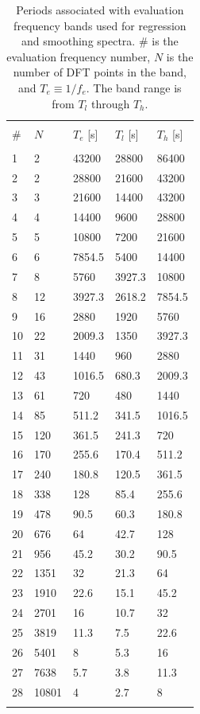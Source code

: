 \documentclass[draft,linenumbers]{agujournal2018}
\begin{document}
\begin{table}
  \caption{Periods associated with evaluation frequency bands used for regression and smoothing spectra. \# is the evaluation frequency number, $N$ is the number of DFT points in the band, and $T_e\equiv 1/f_e$. The band range is from $T_l$ through $T_h$.}
  \centering
  \begin{tabular}{l l l l l}
    \hline \\
    \# & $N$ & $T_e$ [s] & $T_l$ [s] & $T_h$ [s] \\
    \hline \\
    1 & 2 & 43200 & 28800 & 86400 \\
    2 & 2 & 28800 & 21600 & 43200 \\
    3 & 3 & 21600 & 14400 & 43200 \\
    4 & 4 & 14400 & 9600 & 28800 \\
    5 & 5 & 10800 & 7200 & 21600 \\
    6 & 6 & 7854.5 & 5400 & 14400 \\
    7 & 8 & 5760 & 3927.3 & 10800 \\
    8 & 12 & 3927.3 & 2618.2 & 7854.5 \\
    9 & 16 & 2880 & 1920 & 5760 \\
    10 & 22 & 2009.3 & 1350 & 3927.3 \\
    11 & 31 & 1440 & 960 & 2880 \\
    12 & 43 & 1016.5 & 680.3 & 2009.3 \\
    13 & 61 & 720 & 480 & 1440 \\
    14 & 85 & 511.2 & 341.5 & 1016.5 \\
    15 & 120 & 361.5 & 241.3 & 720 \\
    16 & 170 & 255.6 & 170.4 & 511.2 \\
    17 & 240 & 180.8 & 120.5 & 361.5 \\
    18 & 338 & 128 & 85.4 & 255.6 \\
    19 & 478 & 90.5 & 60.3 & 180.8 \\
    20 & 676 & 64 & 42.7 & 128 \\
    21 & 956 & 45.2 & 30.2 & 90.5 \\
    22 & 1351 & 32 & 21.3 & 64 \\
    23 & 1910 & 22.6 & 15.1 & 45.2 \\
    24 & 2701 & 16 & 10.7 & 32 \\
    25 & 3819 & 11.3 & 7.5 & 22.6 \\
    26 & 5401 & 8 & 5.3 & 16 \\
    27 & 7638 & 5.7 & 3.8 & 11.3 \\
    28 & 10801 & 4 & 2.7 & 8 \\
    \hline \\
  \end{tabular}
  \label{evaluationperiods}
\end{table}

\clearpage


\end{document}
